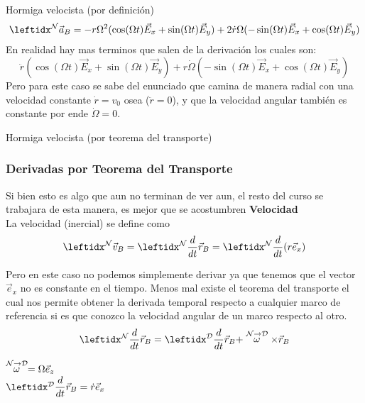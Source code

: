 \begin{solucion}{Hormiga velocista (por definición)}
$$\marc{\vec{a}_B}{N}=-r\Omega^2(\cos(\Omega t)\vec{E}_x+\sin(\Omega t)\vec{E}_y)+2\dot{r}\Omega(-\sin(\Omega t)\vec{E}_x+\cos(\Omega t)\vec{E}_y)$$
En realidad hay mas terminos que salen de la derivación los cuales son:
$$\ddot{r}(\cos(\Omega t)\vec{E}_x+\sin(\Omega t)\vec{E}_y)+r\dot{\Omega}(-\sin(\Omega t)\vec{E}_x+\cos(\Omega t)\vec{E}_y)$$
Pero para este caso se sabe del enunciado que camina de manera radial con una velocidad constante $\dot{r}=v_0$ osea ($\ddot{r}=0$), y que la velocidad angular también es constante por ende $\dot{\Omega}=0$.
\end{solucion}

\begin{solucion}{Hormiga velocista (por teorema del transporte)}
\subsubsection*{Derivadas por Teorema del Transporte}
Si bien esto es algo que aun no terminan de ver aun, el resto del curso se trabajara de esta manera, es mejor que se acostumbren
\textbf{Velocidad}\\
La velocidad (inercial) se define como
$$\marc{\vec{v}_B}{N}=\der{\vec{r}_B}{N}=\der{(r\vec{e}_x)}{N}$$

Pero en este caso no podemos simplemente derivar ya que tenemos que el vector $\vec{e}_x$ no es constante en el tiempo. Menos mal existe el teorema del transporte el cual nos permite obtener la derivada temporal respecto a cualquier marco de referencia si es que conozco la velocidad angular de un marco respecto al otro.
$$\transport{\vec{r}_B}{N}{D}$$

$\stackrel{\mathcal{N} \to \mathcal{D}}{\omega}=\Omega \vec{e}_z$\\
$\der{\vec{r}_B}{D}=\dot{r}\vec{e}_x$


\end{solucion}
